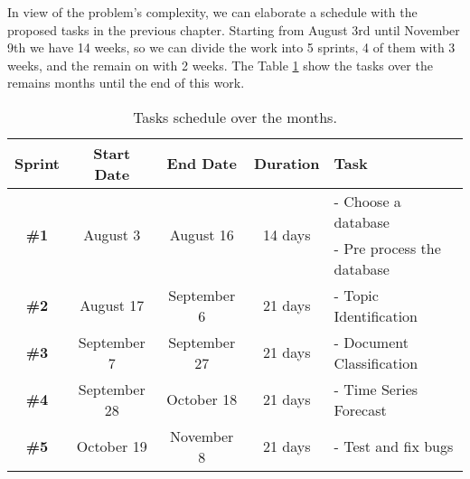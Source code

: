In view of the problem's complexity, we can elaborate a schedule with the proposed tasks in the previous chapter. Starting from August 3rd until November 9th we have 14 weeks, so we can divide the work into 5 sprints, 4 of them with 3 weeks, and the remain on with 2 weeks. The Table \ref{tab:roadmap-table} show the tasks over the remains months until the end of this work.

\begin{table}[h!]
	\centering
	\caption{Tasks schedule over the months.}
	\label{tab:roadmap-table}
	\begin{tabular}{c|cccl}
		\hline
		       \textbf{Sprint}        &    \textbf{Start Date}    &     \textbf{End Date}      &    \textbf{Duration}     & \textbf{Task}              \\ \hline
		\multirow{2}{*}{\textbf{\#1}} & \multirow{2}{*}{August 3} & \multirow{2}{*}{August 16} & \multirow{2}{*}{14 days} & - Choose a database         \\
		                              &                           &                            &                          & - Pre process the database \\
		        \textbf{\#2}          &         August 17         &        September 6         &         21 days          & - Topic Identification     \\
		        \textbf{\#3}          &        September 7        &        September 27        &         21 days          & - Document Classification  \\
		        \textbf{\#4}          &       September 28        &         October 18         &         21 days          & - Time Series Forecast     \\
		        \textbf{\#5}          &        October 19         &         November 8         &         21 days          & - Test and fix bugs        \\ \hline
	\end{tabular}
\end{table}

